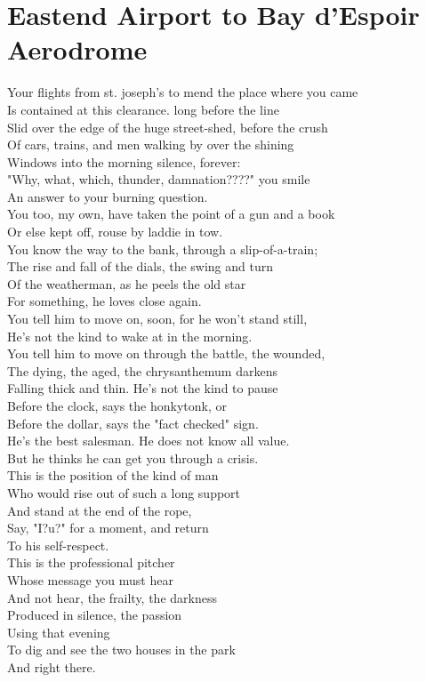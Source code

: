 \documentclass[smalldemyvopaper,11pt,twoside,onecolumn,openright,extrafontsizes]{memoir}
\begin{document}
\chapter{Eastend Airport to Bay d'Espoir Aerodrome}
Your flights from st. joseph's to mend the place where you came
\\Is contained at this clearance. long before the line
\\Slid over the edge of the huge street-shed, before the crush
\\Of cars, trains, and men walking by over the shining
\\Windows into the morning silence, forever:
\\"Why, what, which, thunder, damnation????" you smile
\\An answer to your burning question.
\\You too, my own, have taken the point of a gun and a book
\\Or else kept off, rouse by laddie in tow.
\\You know the way to the bank, through a slip-of-a-train;
\\The rise and fall of the dials, the swing and turn
\\Of the weatherman, as he peels the old star
\\For something, he loves close again.
\\You tell him to move on, soon, for he won't stand still,
\\He's not the kind to wake at in the morning.
\\You tell him to move on through the battle, the wounded,
\\The dying, the aged, the chrysanthemum darkens
\\Falling thick and thin. He's not the kind to pause
\\Before the clock, says the honkytonk, or
\\Before the dollar, says the "fact checked" sign.
\\He's the best salesman. He does not know all value.
\\But he thinks he can get you through a crisis.
\\This is the position of the kind of man
\\Who would rise out of such a long support
\\And stand at the end of the rope,
\\Say, "I?u?" for a moment, and return
\\To his self-respect.
\\This is the professional pitcher
\\Whose message you must hear
\\And not hear, the frailty, the darkness
\\Produced in silence, the passion
\\Using that evening
\\To dig and see the two houses in the park
\\And right there.
\end{document}
